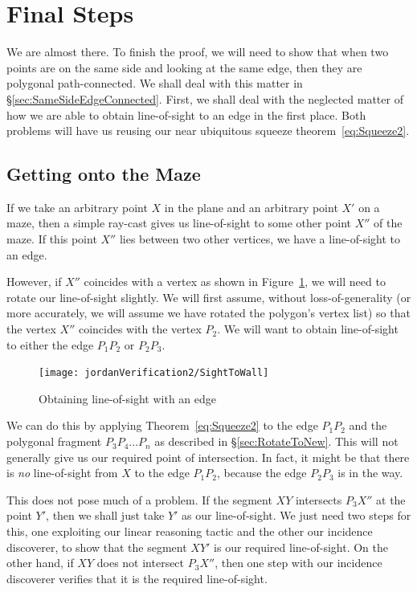 \section{Final Steps}
We are almost there. To finish the proof, we will need to show that when two points are on the same side and looking at the same edge, then they are polygonal path-connected. We shall deal with this matter in \S\ref{sec:SameSideEdgeConnected}. First, we shall deal with the neglected matter of how we are able to obtain line-of-sight to an edge in the first place. Both problems will have us reusing our near ubiquitous squeeze theorem~\eqref{eq:Squeeze2}.

\subsection{Getting onto the Maze}
If we take an arbitrary point $X$ in the plane and an arbitrary point $X'$ on a maze, then a simple ray-cast gives us line-of-sight to some other point $X''$ of the maze. If this point $X''$ lies between two other vertices, we have a line-of-sight to an edge. 

However, if $X''$ coincides with a vertex as shown in Figure~\ref{fig:SightToEdge}, we will need to rotate our line-of-sight slightly. We will first assume, without loss-of-generality (or more accurately, we will assume we have rotated the polygon's vertex list) so that the vertex $X''$ coincides with the vertex $P_2$. We will want to obtain line-of-sight to either the edge $P_1P_2$ or $P_2P_3$.

\begin{figure}
  \centering\texttt{[image: jordanVerification2/SightToWall]}
  \caption{Obtaining line-of-sight with an edge}
  \label{fig:SightToEdge}
\end{figure}

We can do this by applying Theorem~\ref{eq:Squeeze2} to the edge $P_1P_2$ and the polygonal fragment $P_3P_4\ldots P_n$ as described in \S\ref{sec:RotateToNew}. This will not generally give us our required point of intersection. In fact, it might be that there is \emph{no} line-of-sight from $X$ to the edge $P_1P_2$, because the edge $P_2P_3$ is in the way. 

This does not pose much of a problem. If the segment $XY$ intersects $P_3X''$ at the point $Y'$, then we shall just take $Y'$ as our line-of-sight. We just need two steps for this, one exploiting our linear reasoning tactic and the other our incidence discoverer, to show that the segment $XY'$ is our required line-of-sight. On the other hand, if $XY$ does not intersect $P_3X''$, then one step with our incidence discoverer verifies that it is the required line-of-sight. 

